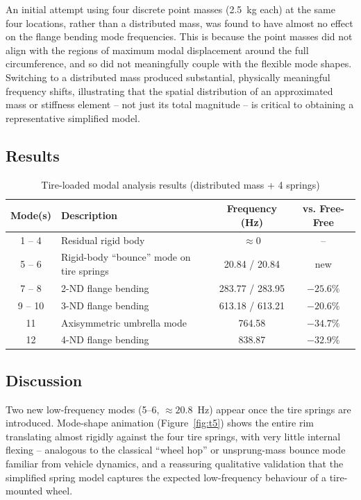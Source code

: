 \documentclass[11pt]{article}
\begin{document}
An initial attempt using four discrete point masses (2.5~kg each) at the same four
locations, rather than a distributed mass, was found to have almost no effect on the
flange bending mode frequencies. This is because the point masses did not align with
the regions of maximum modal displacement around the full circumference, and so did
not meaningfully couple with the flexible mode shapes. Switching to a distributed mass
produced substantial, physically meaningful frequency shifts, illustrating that the
spatial distribution of an approximated mass or stiffness element -- not just its total
magnitude -- is critical to obtaining a representative simplified model.

\subsection{Results}

\begin{table}[H]
\centering
\caption{Tire-loaded modal analysis results (distributed mass + 4 springs)}
\label{tab:tire}
\begin{tabular}{clcc}
\toprule
\textbf{Mode(s)} & \textbf{Description} & \textbf{Frequency (Hz)} & \textbf{vs. Free-Free} \\
\midrule
1 -- 4  & Residual rigid body & $\approx 0$ & -- \\
5 -- 6  & Rigid-body ``bounce'' mode on tire springs & 20.84 / 20.84 & new \\
7 -- 8  & 2-ND flange bending & 283.77 / 283.95 & $-25.6\%$ \\
9 -- 10 & 3-ND flange bending & 613.18 / 613.21 & $-20.6\%$ \\
11      & Axisymmetric umbrella mode & 764.58 & $-34.7\%$ \\
12      & 4-ND flange bending & 838.87 & $-32.9\%$ \\
\bottomrule
\end{tabular}
\end{table}

\subsection{Discussion}

Two new low-frequency modes (5--6, $\approx 20.8$~Hz) appear once the tire springs
are introduced. Mode-shape animation (Figure~\ref{fig:t5}) shows the entire rim
translating almost rigidly against the four tire springs, with very little internal
flexing -- analogous to the classical ``wheel hop'' or unsprung-mass bounce mode
familiar from vehicle dynamics, and a reassuring qualitative validation that the
simplified spring model captures the expected low-frequency behaviour of a
tire-mounted wheel.
\end{document}

